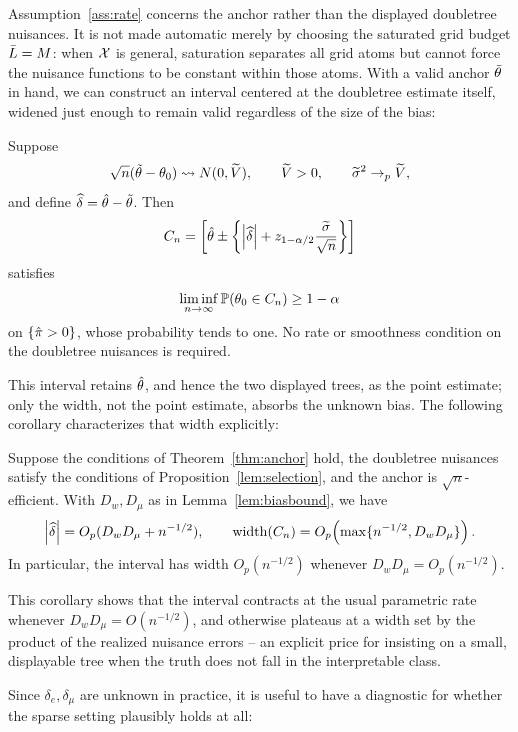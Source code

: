 \documentclass[12pt]{article}
\begin{document}
Assumption~\ref{ass:rate} concerns the anchor rather than the displayed
doubletree nuisances. It is not made automatic merely by choosing the
saturated grid budget $\bar{L}=M$: when $\mathcal{X}$ is general, saturation separates
all grid atoms but cannot force the nuisance functions to be constant within
those atoms. With a valid anchor $\tilde{\theta}$ in hand, we can construct an
interval centered at the doubletree estimate itself, widened just enough to
remain valid regardless of the size of the bias:

\begin{theorem}
\label{thm:anchor}
Suppose
\[
  \sqrt n(\tilde{\theta}-\theta_0)
  \rightsquigarrow N(0,\widetilde V),
  \qquad
  \widetilde V>0,
  \qquad
  \widetilde\sigma^2\to_p\widetilde V,
\]
and define $\widehat\delta=\hat{\theta}-\tilde{\theta}$. Then
\[
  C_n
  =
  \left[
    \hat{\theta}
    \pm
    \left\{
      \left|\widehat\delta\right|
      +
      z_{1-\alpha/2}\frac{\widetilde\sigma}{\sqrt n}
    \right\}
  \right]
\]
satisfies
\[
  \liminf_{n\to\infty}\mathbb{P}(\theta_0\in C_n)\ge1-\alpha
\]
on $\{\hat{\pi}>0\}$, whose probability tends to one. No rate or smoothness
condition on the doubletree nuisances is required.
\end{theorem}

This interval retains $\hat{\theta}$, and hence the two displayed trees, as the point estimate; only the width, not the point estimate, absorbs the unknown bias. The following corollary characterizes that width explicitly:

\begin{corollary}[Width]
\label{cor:width}
Suppose the conditions of Theorem~\ref{thm:anchor} hold, the doubletree
nuisances satisfy the conditions of Proposition~\ref{lem:selection},
and the anchor is $\sqrt n$-efficient. With $D_w, D_\mu$ as in
Lemma~\ref{lem:biasbound}, we have
\[
  \left|\widehat\delta\right|
  =
  O_p(D_wD_\mu+n^{-1/2}),
  \qquad
  \operatorname{width}(C_n)
  =
  O_p\!\left(\max\{n^{-1/2},D_wD_\mu\}\right).
\]
In particular, the interval has width $O_p(n^{-1/2})$ whenever
$D_wD_\mu=O_p(n^{-1/2})$.
\end{corollary}

This corollary shows that the interval contracts at the usual parametric rate whenever $D_w D_\mu = O(n^{-1/2})$, and otherwise plateaus at a width set by the product of the realized nuisance errors -- an explicit price for insisting on a small, displayable tree when the truth does not fall in the interpretable class.

Since $\delta_e, \delta_\mu$ are unknown in practice, it is useful to have a diagnostic for whether the sparse setting plausibly holds at all:
\end{document}
